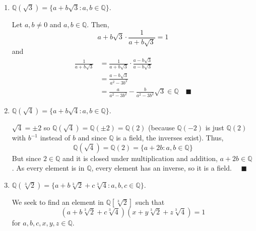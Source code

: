 \documentclass[12pt]{article}
\newcommand{\Q}{\mathbb{Q}}
\newcommand{\qed}{\quad \blacksquare}
\begin{document}
        \begin{enumerate}
            \item $\Q(\sqrt 3) = \{a + b \sqrt 3: a, b \in \Q \}$.
                
                \color{blue}
                    Let $a, b \neq 0$ and $a, b \in \Q$. Then, 
                    \[a + b\sqrt 3 \cdot \frac{1}{a + b \sqrt 3}  = 1\] 
                    and 
                    \begin{align*}
                        \frac{1}{a + b \sqrt 3} &=  \frac{1}{a + b \sqrt 3} \cdot \frac{a - b \sqrt 3}{a - b\sqrt 3}\\
                        &= \frac{a - b\sqrt 3}{a^2 - 3b^2}\\
                        &= \frac{a}{a^2 - 3b^2} - \frac{b}{a^2 - 3b^2}\sqrt{3} \in \Q \qed
                    \end{align*}
                \color{black}
                
            \item $\Q(\sqrt 4) =\{a + b\sqrt 4: a, b \in \Q \}.$
            
                \color{blue}
                    $\sqrt 4 = \pm 2$ so $\Q(\sqrt 4) = \Q(\pm 2) = \Q(2)$ (because $\Q(-2)$ is just $\Q(2)$ with $b^{-1}$ instead of $b$ and since $\Q$ is a field, the inverses exist). Thus, 
                    \[\Q(\sqrt 4) = \Q(2) = \{a + 2b : a, b \in \Q\}\]
                    But since $2 \in \Q$ and it is closed under multiplication and addition, $a + 2b \in \Q$. As every element is in $\Q$, every element has an inverse, so it is a field. $\qed$
                \color{black}

            \item $\Q(\sqrt[3]{2}) = \{a+ b\sqrt[3]{2}+c\sqrt[3]{4} : a, b,c \in \Q\}.$
                
                \color{blue}
                    We seek to find an element in $\Q[\sqrt[3]{2}]$ such that 
                    \[(a+ b\sqrt[3]{2}+c\sqrt[3]{4})(x+ y\sqrt[3]{2}+z\sqrt[3]{4}) = 1\] 
                    for $a,b,c,x,y,z \in \Q$. 
                    

\end{enumerate}
\end{document}
